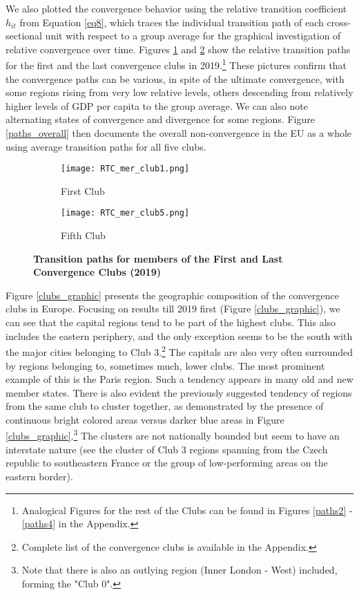 \documentclass[11pt]{article}
\begin{document}
We also plotted the convergence behavior using the relative transition coefficient $h_{it}$ from Equation \ref{eq8}, which traces the individual transition path of each cross-sectional unit with respect to a group average for the graphical investigation of relative convergence over time. Figures \ref{paths1} and \ref{paths5} show the relative transition paths for the first and the last convergence clubs in 2019.\footnote{Analogical Figures for the rest of the Clubs can be found in Figures \ref{paths2} - \ref{paths4} in the Appendix.} These pictures confirm that the convergence paths can be various, in spite of the ultimate convergence, with some regions rising from very low relative levels, others descending from relatively higher levels of GDP per capita to the group average. We can also note alternating states of convergence and divergence for some regions. Figure \ref{paths_overall} then documents the overall non-convergence in the EU as a whole using average transition paths for all five clubs.

\begin{figure}[!htbp]%
    \centering
\begin{subfigure}{0.45\textwidth}
    \centering
    \texttt{[image: RTC\_mer\_club1.png]}
    \caption{First Club}
    \label{paths1}   
\end{subfigure}\hfill
\begin{subfigure}{0.45\textwidth}
    \centering
    \texttt{[image: RTC\_mer\_club5.png]}
    \caption{Fifth Club}
    \label{paths5}
\end{subfigure}
\caption{\textbf{Transition paths for members of the First and Last Convergence Clubs (2019)}}
\label{convergence_paths}

\end{figure}


Figure \ref{clubs_graphic} presents the geographic composition of the convergence clubs in Europe. Focusing on results till 2019 first (Figure \ref{clubs_graphic}), we can see that the capital regions tend to be part of the highest clubs. This also includes the eastern periphery, and the only exception seems to be the south with the major cities belonging to Club 3.\footnote{Complete list of the convergence clubs is available in the Appendix.} The capitals are also very often surrounded by regions belonging to, sometimes much, lower clubs. The most prominent example of this is the Paris region. Such a tendency appears in many old and new member states. There is also evident the previously suggested tendency of regions from the same club to cluster together, as demonstrated by the presence of continuous bright colored areas versus darker blue areas in Figure \ref{clubs_graphic}.\footnote{Note that there is also an outlying region (Inner London - West) included, forming the "Club 0".} The clusters are not nationally bounded but seem to have an interstate nature (see the cluster of Club 3 regions spanning from the Czech republic to southeastern France or the group of low-performing areas on the eastern border).
\end{document}
